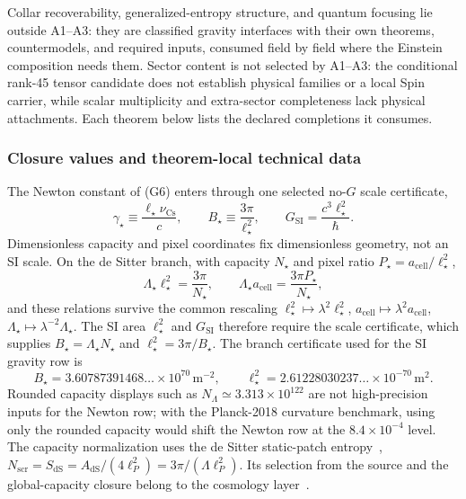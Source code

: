 


Collar recoverability, generalized-entropy structure, and quantum focusing lie outside A1--A3:
they are classified gravity interfaces with their own theorems, countermodels, and
required inputs, consumed field by field where the Einstein composition needs them. Sector
content is not selected by A1--A3: the conditional rank-45 tensor
candidate does not establish physical families or a local Spin carrier, while
scalar multiplicity and extra-sector completeness lack physical attachments.
Each theorem below lists the
declared completions it consumes.

\subsubsection{Closure values and theorem-local technical data}\label{14-assumptions-and-external-inputs}

The Newton constant of (G6) enters through one selected no-\(G\) scale certificate,
\[
\gamma_\star\equiv\frac{\ell_\star\nu_{\mathrm{Cs}}}{c},
\qquad
B_\star\equiv\frac{3\pi}{\ell_\star^2},
\qquad
G_{\mathrm{SI}}=\frac{c^3\ell_\star^2}{\hbar}.
\]
Dimensionless capacity and pixel coordinates fix dimensionless geometry, not an SI scale. On
the de Sitter branch, with capacity \(N_\star\) and pixel ratio
\(P_\star=a_{\mathrm{cell}}/\ell_\star^2\),
\[
\Lambda_\star\ell_\star^2=\frac{3\pi}{N_\star},
\qquad
\Lambda_\star a_{\mathrm{cell}}=\frac{3\pi P_\star}{N_\star},
\]
and these relations survive the common rescaling
\(\ell_\star^2\mapsto\lambda^2\ell_\star^2\),
\(a_{\mathrm{cell}}\mapsto\lambda^2a_{\mathrm{cell}}\),
\(\Lambda_\star\mapsto\lambda^{-2}\Lambda_\star\). The SI area \(\ell_\star^2\) and
\(G_{\mathrm{SI}}\) therefore require the scale certificate, which supplies
\(B_\star=\Lambda_\star N_\star\) and \(\ell_\star^2=3\pi/B_\star\). The branch certificate
used for the SI gravity row is
\[
B_\star=
3.60787391468\ldots
\times10^{70}\,\mathrm{m^{-2}},
\qquad
\ell_\star^2=
2.61228030237\ldots
\times10^{-70}\,\mathrm{m^2}.
\]
Rounded capacity displays such as \(N_\Lambda\simeq3.313\times10^{122}\) are not
high-precision inputs for the Newton row; with the Planck-2018 curvature benchmark, using only
the rounded capacity would shift the Newton row at the \(8.4\times10^{-4}\) level. The capacity
normalization uses the de Sitter static-patch entropy~\cite{gibbonsHawking77},
\(N_{\mathrm{scr}}=S_{\mathrm{dS}}=A_{\mathrm{dS}}/(4\ell_P^2)=3\pi/(\Lambda\ell_P^2)\).
Its selection from the source and the global-capacity closure belong to the cosmology
layer~\cite{ophdesittershock}.

